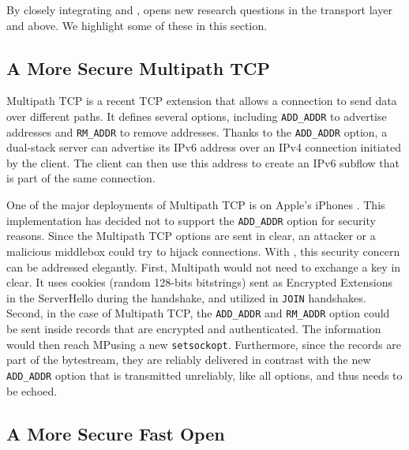 \label{sec:research}
By closely integrating \tcp and \tls, \tcpls opens new research questions
in the transport layer and above. We highlight some of these in this section.

\subsection{A More Secure Multipath TCP}

Multipath TCP \cite{rfc6824, rfc8684} is a recent TCP extension that allows a connection
to send data over different paths. It defines several \tcp options, including
\texttt{ADD\_ADDR} to advertise addresses and \texttt{RM\_ADDR} to remove addresses. Thanks to the \texttt{ADD\_ADDR} option, a dual-stack server can advertise
its IPv6 address over an IPv4 connection initiated by the client. The client can
then use this address to create an IPv6 subflow that is part of the same
connection.

One of the major deployments of Multipath TCP is on Apple's iPhones
\cite{bonaventure2016multipath}. This implementation has decided not to
support the \texttt{ADD\_ADDR} option for security reasons. Since the
Multipath TCP options are sent in clear, an attacker or
a malicious middlebox could try to hijack connections.
With \tcpls, this
security concern can be addressed elegantly. First, Multipath \tcpls
would not need to exchange a key in clear. It uses cookies (random 128-bits
bitstrings) sent as Encrypted Extensions in the ServerHello during the
handshake, and utilized in \tcpls \texttt{JOIN} handshakes.
Second, in the case of Multipath TCP, the \texttt{ADD\_ADDR} and
\texttt{RM\_ADDR} option could be sent inside \tls records that are encrypted and
authenticated. The information would then reach MP\tcp using a new
\texttt{setsockopt}. Furthermore, since the \tls records are part of the bytestream,
they are reliably delivered in contrast with the new \texttt{ADD\_ADDR} option
that is transmitted unreliably, like all \tcp options, and thus needs to be
echoed.

\subsection{A More Secure \tcp Fast Open}

